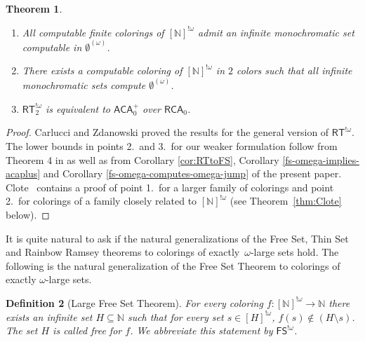 \documentclass[10pt,a4paper]{article}
\newcommand{\RCA}[0]{\mathsf{RCA}}
\newcommand{\ACA}[0]{\mathsf{ACA}}
\newcommand{\FS}[0]{\mathsf{FS}}
\newcommand{\RT}[0]{\mathsf{RT}}
\newcommand{\NN}[0]{\mathbb{N}}
\newtheorem{theorem}{Theorem}
\numberwithin{theorem}{section}
\newtheorem{definition}[theorem]{Definition}
\begin{document}
\begin{theorem}\label{thm:car-zda}
\leavevmode
\begin{enumerate}
\item All computable finite colorings of  $[\NN]^{!\omega}$ admit an infinite monochromatic set computable in $\emptyset^{(\omega)}$. 
\item There exists a computable coloring of $[\NN]^{!\omega}$ in $2$ colors such that all infinite monochromatic sets compute 
$\emptyset^{(\omega)}$. 
\item $\RT^{!\omega}_2$ is equivalent to $\ACA_0^+$ over $\RCA_0$.
\end{enumerate}
\end{theorem}
\begin{proof}
Carlucci and Zdanowski \cite{carlucci2014strength} proved the results for the general version of $\RT^{!\omega}$. The lower bounds in points 2.~and 3.~for our weaker formulation follow from Theorem 4 in \cite{car-main-zda2024} as well as from Corollary \ref{cor:RTtoFS}, Corollary \ref{fs-omega-implies-acaplus} and Corollary \ref{fs-omega-computes-omega-jump} of the present paper. Clote~\cite{clote1986generalization} contains a proof of point 1.~for a larger family of colorings and point 2.~for colorings of a family closely related to $[\NN]^{!\omega}$ (see Theorem~\ref{thm:Clote} below).
\end{proof}


It is quite natural to ask if the natural generalizations of the Free Set, Thin Set and Rainbow Ramsey theorems to colorings of exactly~$\omega$-large sets hold. 
The following is the natural generalization of the Free Set Theorem to colorings of exactly $\omega$-large sets.

\begin{definition}[Large Free Set Theorem]\label{def:large_free}
For every coloring $f:[\NN]^{!\omega} \to \NN$ there exists an infinite set $H\subseteq\NN$ such that for every set $s \in [H]^{!\omega}$, $f(s) \notin (H \setminus s)$. The set $H$ is called \emph{free} for $f$. We abbreviate this statement by $\FS^{!\omega}$. 
\end{definition}

\end{document}

